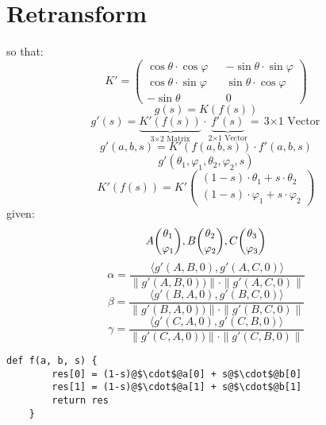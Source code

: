 \section{Retransform}
so that:
\begin{equation}
    K'=
    \begin{pmatrix}
       \cos\theta\cdot\cos\varphi && -\sin\theta\cdot\sin\varphi \\
       \cos\theta\cdot\sin\varphi && \sin\theta\cdot\cos\varphi \\
       -\sin\theta && 0
    \end{pmatrix}
\end{equation}
\begin{equation}
    g(s)=K(f(s))
\end{equation}
\begin{equation}
    g'(s) = \underbrace{K'(f(s))}_{\text{3$\times$2 Matrix}}\cdot\underbrace{f'(s)}_{\text{2$\times$1 Vector}}=\text{3$\times$1 Vector}
\end{equation}
\begin{equation}
    g'(a,b,s) = K'(f(a,b,s))\cdot f'(a,b,s)
\end{equation}
\begin{equation}
    g'(\theta_1,\varphi_1,\theta_2,\varphi_2,s)
\end{equation}
\begin{equation}
    K'(f(s))=K'
    \begin{pmatrix}
        (1-s)\cdot\theta_1 + s\cdot\theta_2 \\
        (1-s)\cdot\varphi_1 + s\cdot\varphi_2
    \end{pmatrix}
\end{equation}
given:
\begin{equation*}
    A\dbinom{\theta_1}{\varphi_1}, B\dbinom{\theta_2}{\varphi_2}, C\dbinom{\theta_3}{\varphi_3}
\end{equation*}
\begin{equation}
    \alpha=\frac{\langle g'(A,B,0), g'(A,C,0)\rangle}{\|g'(A,B,0))\|\cdot \|g'(A,C,0)\|}
\end{equation}
\begin{equation}
    \beta=\frac{\langle g'(B,A,0), g'(B,C,0)\rangle}{\|g'(B,A,0))\|\cdot \|g'(B,C,0)\|}
\end{equation}
\begin{equation}
    \gamma=\frac{\langle g'(C,A,0), g'(C,B,0)\rangle}{\|g'(C,A,0))\|\cdot \|g'(C,B,0)\|}
\end{equation}
\begin{lstlisting}[escapechar=@]
    def f(a, b, s) {
        res[0] = (1-s)@$\cdot$@a[0] + s@$\cdot$@b[0]
        res[1] = (1-s)@$\cdot$@a[1] + s@$\cdot$@b[1]
        return res
    }
\end{lstlisting}
